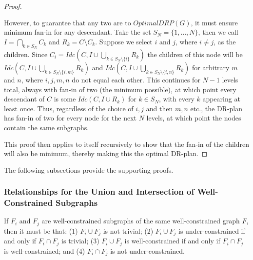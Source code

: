 \begin{proof}
\begin{enumerate}
However, to guarantee that any two are  to $OptimalDRP(G)$, it must ensure minimum fan-in for any descendant. Take the set $S_N=\{1,\dots,N\}$, then we call $I=\bigcap_{k\in S_N}{C_k}$ and $R_k=C\setminus C_k$. Suppose we select $i$ and $j$, where $i\neq j$, as the children. Since
$C_i=Idc\left(C,I\cup\bigcup_{k\in S_N\setminus\{i\}}{R_k}\right)$
the children of this node will be
$Idc\left(C,I\cup\bigcup_{k\in S_N\setminus\{i,m\}}{R_k}\right)$
and
$Idc\left(C,I\cup\bigcup_{k\in S_N\setminus\{i,n\}}{R_k}\right)$
for arbitrary $m$ and $n$, where $i,j,m,n$ do not equal each other.  This continues for $N-1$ levels total, always with fan-in of two (the minimum possible), at which point every descendant of $C$ is some $Idc(C,I\cup R_k)$ for $k\in S_N$, with every $k$ appearing at least once. Thus, regardless of the choice of $i,j$ and then $m,n$ etc., the DR-plan has fan-in of two for every node for the next $N$ levels, at which point the nodes contain the same subgraphs.
\end{enumerate}

This proof then applies to itself recursively to show that the fan-in of the children will also be minimum, thereby making this the optimal DR-plan.
\end{proof}

The following subsections provide the supporting proofs.




\subsubsection{Relationships for the Union and Intersection of Well-Constrained Subgraphs}
\label{sec:union_intersection}

\begin{remark}\label{lemma:union_intersection}
If $F_i$ and $F_j$ are well-constrained subgraphs of the same well-constrained graph $F$, then it must be that: (1) $F_i\cup F_j$ is not trivial; (2) $F_i\cup F_j$ is under-constrained if and only if $F_i\cap F_j$ is trivial; (3) $F_i\cup F_j$ is well-constrained if and only if $F_i\cap F_j$ is well-constrained; and (4) $F_i\cap F_j$ is not under-constrained.
\end{remark}

